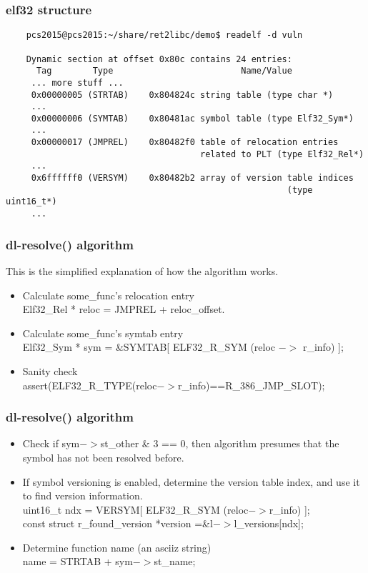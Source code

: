\documentclass[10pt]{beamer}
\begin{document}
\begin{frame}[fragile]
\frametitle{elf32 structure}

	\scriptsize   
	\begin{verbatim}
	pcs2015@pcs2015:~/share/ret2libc/demo$ readelf -d vuln
	
	Dynamic section at offset 0x80c contains 24 entries:
	  Tag        Type                         Name/Value
	 ... more stuff ...
	 0x00000005 (STRTAB)    0x804824c string table (type char *)
	 ...
	 0x00000006 (SYMTAB)    0x80481ac symbol table (type Elf32_Sym*)
	 ...
	 0x00000017 (JMPREL)    0x80482f0 table of relocation entries 
	                                  related to PLT (type Elf32_Rel*)
	 ...
	 0x6ffffff0 (VERSYM)    0x80482b2 array of version table indices  
	                                                   (type uint16_t*)
	 ... 
	\end{verbatim}
	\normalsize

\end{frame}

\begin{frame}[fragile]
\frametitle{dl-resolve() algorithm}

This is the simplified explanation of how the algorithm works.

 \begin{itemize}
    \item  Calculate some\_func's relocation entry
    \\
    Elf32\_Rel * reloc = JMPREL + reloc\_offset.
    
    \item Calculate some\_func's symtab entry
    \\
    Elf32\_Sym * sym = \&SYMTAB[ ELF32\_R\_SYM (reloc $->$ r\_info) ];	
  	
  	\item Sanity check 
  	\\
  	assert(ELF32\_R\_TYPE(reloc$->$r\_info)==R\_386\_JMP\_SLOT);
  \end{itemize}

\end{frame}


\begin{frame}[fragile]
\frametitle{dl-resolve() algorithm}
 \begin{itemize}
    \item Check if sym$->$st\_other \& 3 == 0, then algorithm presumes that the symbol has not been resolved before.
    
    \item If symbol versioning is enabled, determine the version table index, and use it to find version information.
    \\
    uint16\_t ndx = VERSYM[ ELF32\_R\_SYM (reloc$->$r\_info) ]; 
    \\
    const struct r\_found\_version *version =\&l$->$l\_versions[ndx];
    
    \item Determine function name (an asciiz string)
    \\
    name = STRTAB + sym$->$st\_name;
  \end{itemize}

\end{frame}
\end{document}

